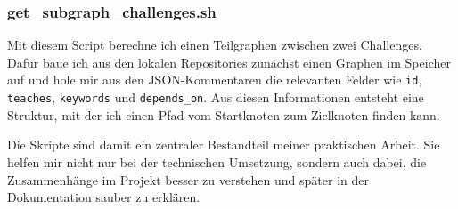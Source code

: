 \subsubsection{get\_subgraph\_challenges.sh}

Mit diesem Script berechne ich einen Teilgraphen zwischen zwei Challenges. Dafür baue ich aus den lokalen Repositories zunächst einen Graphen im Speicher auf und hole mir aus den JSON-Kommentaren die relevanten Felder wie \texttt{id}, \texttt{teaches}, \texttt{keywords} und \texttt{depends\_on}. Aus diesen Informationen entsteht eine Struktur, mit der ich einen Pfad vom Startknoten zum Zielknoten finden kann.

Die Skripte sind damit ein zentraler Bestandteil meiner praktischen Arbeit. Sie helfen mir nicht nur bei der technischen Umsetzung, sondern auch dabei, die Zusammenhänge im Projekt besser zu verstehen und später in der Dokumentation sauber zu erklären.